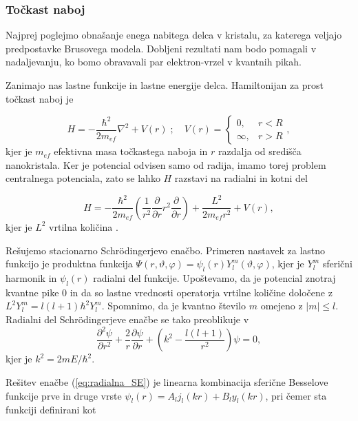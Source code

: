 \documentclass[twoside,11pt]{article}
\begin{document}
\subsubsection{Točkast naboj}
Najprej poglejmo obnašanje enega nabitega delca v kristalu, za katerega veljajo predpostavke Brusovega modela. Dobljeni rezultati nam bodo pomagali v nadaljevanju, ko bomo obravavali par elektron-vrzel v kvantnih pikah.

Zanimajo nas lastne funkcije in lastne energije delca. Hamiltonijan za prost točkast naboj je

\begin{equation}
   H = -\frac{\hbar^2}{2m_{ef}}\nabla^2 + V(r) \; ; \quad V(r) = \begin{cases}
                                                   0,  & r < R \\
                                                   \infty,  & r > R
                                                   \end{cases},
\end{equation}
kjer je $m_{ef}$ efektivna masa točkastega naboja in $r$ razdalja od središča nanokristala.
Ker je potencial odvisen samo od radija, imamo torej problem centralnega potenciala, zato se lahko $H$ razstavi na radialni in kotni del

\begin{equation}
   H = -\frac{\hbar^2}{2m_{ef}} \left( \frac{1}{r^2} \frac{\partial}{\partial r} r^2 \frac{\partial}{\partial r}\right) + \frac{L^2}{2m_{ef}r^2} + V(r), 
\end{equation}
kjer je $L^2$ vrtilna količina \cite{kvantna_ramšak}.

Rešujemo stacionarno Schrödingerjevo enačbo. Primeren nastavek za lastno funkcijo je produktna funkcija $\varPsi(r, \vartheta, \varphi) = \psi_l(r) Y_l^m(\vartheta, \varphi)$, kjer je $Y_l^m$ sferični harmonik
in $\psi_l(r)$ radialni del funkcije. 
Upoštevamo, da je potencial znotraj kvantne pike $0$ in da so lastne vrednosti operatorja vrtilne količine določene z $L^2 Y_l^m = l(l+1)\hbar^2 Y_l^m$.
Spomnimo, da je kvantno število $m$ omejeno z $|m| \le l$. Radialni del Schrödingerjeve enačbe se tako preoblikuje v
\begin{equation}
   \label{eq:radialna_SE}
   \frac{\partial^2 \psi}{\partial r^2} + \frac{2}{r} \frac{\partial \psi}{\partial r} + \left(k^2 - \frac{l(l+1)}{r^2}\right)\psi = 0,
\end{equation}
kjer je $k^2 = 2mE/\hbar^2$.

Rešitev enačbe (\ref{eq:radialna_SE}) je linearna kombinacija sferične Besselove funkcije prve in druge vrste $\psi_l(r) = A_l j_l(kr) + B_l y_l(kr)$, pri čemer sta funkciji definirani kot
\end{document}
